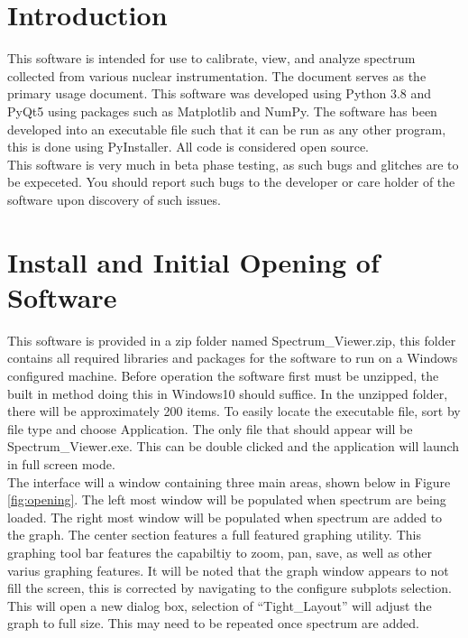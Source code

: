 \section{Introduction}
This software is intended for use to calibrate, view, and analyze spectrum collected from various nuclear instrumentation. The document serves as the primary usage document. This software was developed using Python 3.8 and PyQt5 using packages such as Matplotlib and NumPy. The software has been developed into an executable file such that it can be run as any other program, this is done using PyInstaller. All code is considered open source. \\

This software is very much in beta phase testing, as such bugs and glitches are to be expeceted. You should report such bugs to the developer or care holder of the software upon discovery of such issues.

\section{Install and Initial Opening of Software}
This software is provided in a zip folder named Spectrum\_Viewer.zip, this folder contains all required libraries and packages for the software to run on a Windows configured machine. Before operation the software first must be unzipped, the built in method doing this in Windows10 should suffice. In the unzipped folder, there will be approximately 200 items. To easily locate the executable file, sort by file type and choose Application. The only file that should appear will be Spectrum\_Viewer.exe. This can be double clicked and the application will launch in full screen mode. \\

The interface will a window containing three main areas, shown below in Figure \ref{fig:opening}. The left most window will be populated when spectrum are being loaded. The right most window will be populated when spectrum are added to the graph. The center section features a full featured graphing utility. This graphing tool bar features the capabiltiy to zoom, pan, save, as well as other varius graphing features. It will be noted that the graph window appears to not fill the screen, this is corrected by navigating to the configure subplots selection. This will open a new dialog box, selection of ``Tight\_Layout'' will adjust the graph to full size. This may need to be repeated once spectrum are added. \\

